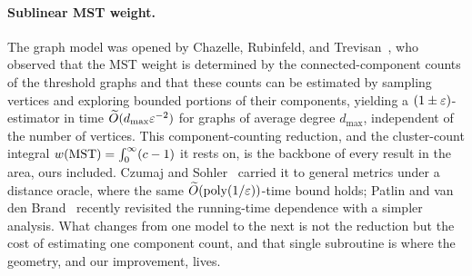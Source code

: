 \paragraph{Sublinear MST weight.}
The graph model was opened by Chazelle, Rubinfeld, and Trevisan~\cite{CRT05}, who observed that the MST
weight is determined by the connected-component counts of the threshold graphs and that these counts can
be estimated by sampling vertices and exploring bounded portions of their components, yielding a
$(1\pm\varepsilon)$-estimator in time $\widetilde{O}(d_{\max}\varepsilon^{-2})$ for graphs of average degree $d_{\max}$,
independent of the number of vertices. This component-counting reduction, and the cluster-count integral
$w(\mathrm{MST})=\int_0^\infty(c-1)$ it rests on, is the backbone of every result in the area, ours included.
Czumaj and Sohler~\cite{CzumajSohler09,CzumajSohler04} carried it to general metrics under a distance
oracle, where the same $\widetilde{O}(\operatorname{poly}(1/\varepsilon))$-time bound holds; Patlin and van den Brand~\cite{PatlinvdB25}
recently revisited the running-time dependence with a simpler analysis. What changes from one model to the
next is not the reduction but the cost of estimating one component count, and that single subroutine is
where the geometry, and our improvement, lives.


